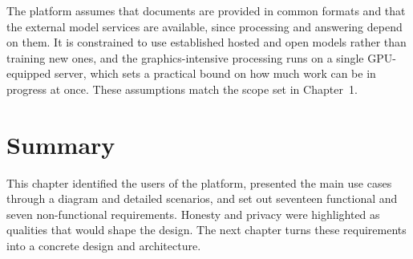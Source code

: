 The platform assumes that documents are provided in common formats and that the
external model services are available, since processing and answering depend on
them. It is constrained to use established hosted and open models rather than
training new ones, and the graphics-intensive processing runs on a single
GPU-equipped server, which sets a practical bound on how much work can be in
progress at once. These assumptions match the scope set in Chapter~1.

\section{Summary}

This chapter identified the users of the platform, presented the main use cases
through a diagram and detailed scenarios, and set out seventeen functional and
seven non-functional requirements. Honesty and privacy were highlighted as
qualities that would shape the design. The next chapter turns these requirements
into a concrete design and architecture.
